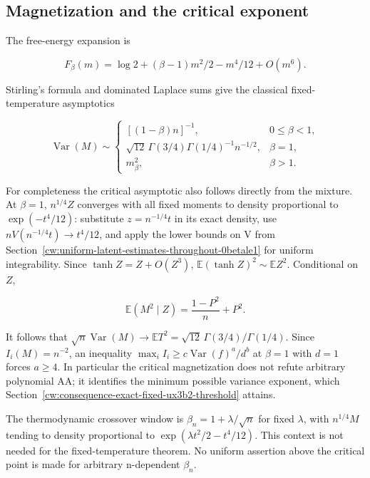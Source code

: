 \subsection{Magnetization and the critical exponent}\label{cw:magnetization-and-the-critical-exponent}

The free-energy expansion is

\[
F_\beta(m)=\log2+(\beta-1)m^2/2-m^4/12+O(m^6).
\]

Stirling's formula and dominated Laplace sums give the classical fixed-temperature asymptotics

\[
\operatorname{Var}(M)\sim
\begin{cases}
[(1-\beta)n]^{-1},&0\le\beta<1,\\
\sqrt{12}\,\Gamma(3/4)\Gamma(1/4)^{-1}n^{-1/2},&\beta=1,\\
m_\beta^2,&\beta>1.
\end{cases}
\]

For completeness the critical asymptotic also follows directly from the mixture. At \(\beta=1\), \(n^{1/4}Z\) converges with all fixed moments to density proportional to \(\exp(-t^4/12)\): substitute \(z=n^{-1/4}t\) in its exact density, use \(nV(n^{-1/4}t)\to t^4/12\), and apply the lower bounds on V from Section~\ref{cw:uniform-latent-estimates-throughout-0betale1} for uniform integrability. Since \(\tanh Z=Z+O(Z^3)\), \(\mathbb E(\tanh Z)^2\sim\mathbb E Z^2\). Conditional on $Z$,

\[
\mathbb E(M^2\mid Z)=\frac{1-P^2}{n}+P^2.
\]

It follows that \(\sqrt n\operatorname{Var}(M)\to\mathbb E T^2=\sqrt{12}\,\Gamma(3/4)/\Gamma(1/4)\). Since \(I_i(M)=n^{-2}\), an inequality \(\max_i I_i\ge c\operatorname{Var}(f)^a/d^b\) at \(\beta=1\) with \(d=1\) forces \(a\ge4\). In particular the critical magnetization does not refute arbitrary polynomial AA; it identifies the minimum possible variance exponent, which Section~\ref{cw:consequence-exact-fixed-ux3b2-threshold} attains.

The thermodynamic crossover window is \(\beta_n=1+\lambda/\sqrt n\) for fixed \(\lambda\), with \(n^{1/4}M\) tending to density proportional to \(\exp(\lambda t^2/2-t^4/12)\). This context is not needed for the fixed-temperature theorem. No uniform assertion above the critical point is made for arbitrary n-dependent \(\beta_n\).

